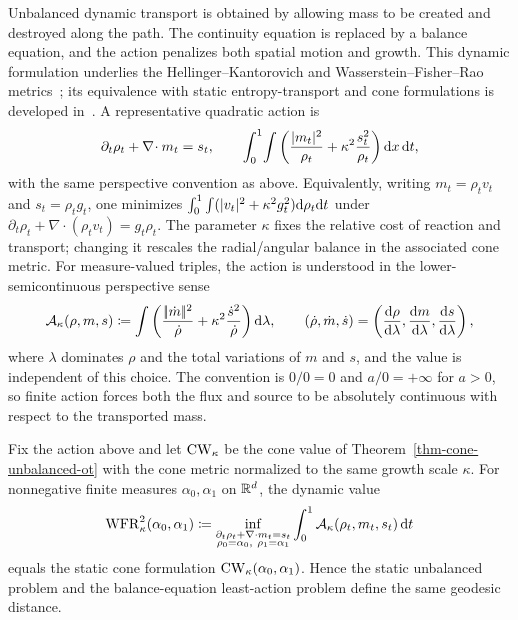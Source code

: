 Unbalanced dynamic transport is obtained by allowing mass to be created and destroyed along the path. The continuity equation is replaced by a balance equation, and the action penalizes both spatial motion and growth. This dynamic formulation underlies the Hellinger--Kantorovich and Wasserstein--Fisher--Rao metrics~\cite{LieroMielkeSavareShort,2017-chizat-focm}; its equivalence with static entropy-transport and cone formulations is developed in~\cite{LieroMielkeSavareLong,2015-chizat-unbalanced}. A representative quadratic action is
	\[
		\partial_t\rho_t+\nabla\!\cdot m_t=s_t,
		\qquad
		\int_0^1\!\int
		\left(\frac{|m_t|^2}{\rho_t}+\kappa^2\frac{s_t^2}{\rho_t}\right)\mathrm{d} x\,\mathrm{d} t,
	\]
	with the same perspective convention as above. Equivalently, writing $m_t=\rho_t v_t$ and $s_t=\rho_t g_t$, one minimizes $\int_0^1\int(|v_t|^2+\kappa^2 g_t^2)\mathrm{d}\rho_t\mathrm{d} t$ under $\partial_t\rho_t+\nabla\!\cdot(\rho_t v_t)=g_t\rho_t$. The parameter $\kappa$ fixes the relative cost of reaction and transport; changing it rescales the radial/angular balance in the associated cone metric. For measure-valued triples, the action is understood in the lower-semicontinuous perspective sense
	\[
		\mathcal A_\kappa(\rho,m,s)
		\coloneqq
		\int
		\left(
			\frac{|\!| \dot m |\!|^2}{\dot\rho}
			+
			\kappa^2\frac{\dot s^2}{\dot\rho}
		\right)\mathrm{d}\lambda,
		\qquad
		(\dot\rho,\dot m,\dot s)
		=
		\left(\frac{\mathrm{d}\rho}{\mathrm{d}\lambda},\frac{\mathrm{d} m}{\mathrm{d}\lambda},\frac{\mathrm{d} s}{\mathrm{d}\lambda}\right),
	\]
	where $\lambda$ dominates $\rho$ and the total variations of $m$ and $s$, and the value is independent of this choice. The convention is $0/0=0$ and $a/0=+\infty$ for $a>0$, so finite action forces both the flux and source to be absolutely continuous with respect to the transported mass.

\begin{prop}\label{prop-static-dynamic-unbalanced}
		Fix the action above and let $\operatorname{CW}_\kappa$ be the cone value of Theorem~\ref{thm-cone-unbalanced-ot} with the cone metric normalized to the same growth scale $\kappa$. For nonnegative finite measures $\alpha_0,\alpha_1$ on $\mathbb{R}^d$, the dynamic value
	\begin{equation}\label{eq-dynamic-unbalanced-ot}
		\operatorname{WFR}_\kappa^2(\alpha_0,\alpha_1)
		\coloneqq
		\inf_{\substack{\partial_t\rho_t+\nabla\cdot m_t=s_t\\
		\rho_0=\alpha_0,\ \rho_1=\alpha_1}}
		\int_0^1
		\mathcal A_\kappa(\rho_t,m_t,s_t)\,\mathrm{d} t
	\end{equation}
		equals the static cone formulation $\operatorname{CW}_\kappa(\alpha_0,\alpha_1)$. Hence the static unbalanced problem and the balance-equation least-action problem define the same geodesic distance.
\end{prop}

